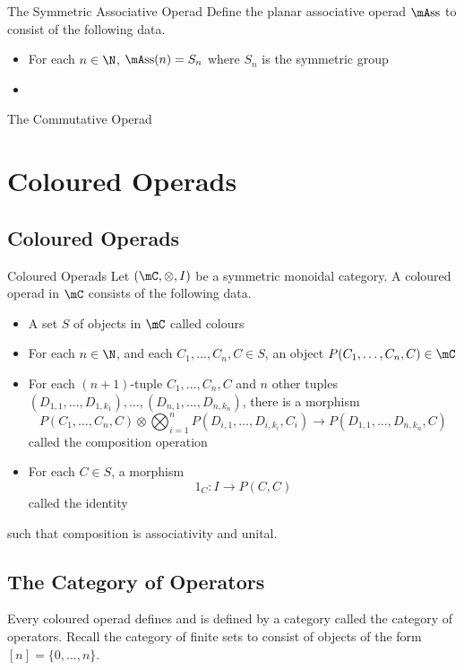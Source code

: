 \documentclass[a4paper]{article}
\begin{document}
\begin{defn}{The Symmetric Associative Operad}{} Define the planar associative operad $\mA\text{ss}$ to consist of the following data. 
\begin{itemize}
\item For each $n\in\N$, $\mA\text{ss}(n)=S_n$ where $S_n$ is the symmetric group
\item 
\end{itemize}
\end{defn}

\begin{defn}{The Commutative Operad}{}
\end{defn}

\pagebreak
\section{Coloured Operads}
\subsection{Coloured Operads}
\begin{defn}{Coloured Operads}{} Let $(\mC,\otimes,I)$ be a symmetric monoidal category. A coloured operad in $\mC$ consists of the following data. 
\begin{itemize}
\item A set $S$ of objects in $\mC$ called colours
\item For each $n\in\N$, and each $C_1,\dots,C_n,C\in S$, an object $P(C_1,\dots,C_n,C)\in\mC$
\item For each $(n+1)$-tuple $C_1,\dots,C_n,C$ and $n$ other tuples $(D_{1,1},\dots,D_{1,k_1}),\dots,(D_{n,1},\dots,D_{n,k_n})$, there is a morphism $$P(C_1,\dots,C_n,C)\otimes\bigotimes_{i=1}^nP(D_{i,1},\dots,D_{i,k_i},C_i)\to P(D_{1,1},\dots,D_{n,k_n},C)$$ called the composition operation
\item For each $C\in S$, a morphism $$1_C:I\to P(C,C)$$ called the identity
\end{itemize}
such that composition is associativity and unital. 
\end{defn}

\subsection{The Category of Operators}
Every coloured operad defines and is defined by a category called the category of operators. Recall the category of finite sets to consist of objects of the form $[n]=\{0,\dots,n\}$. 
\end{document}
